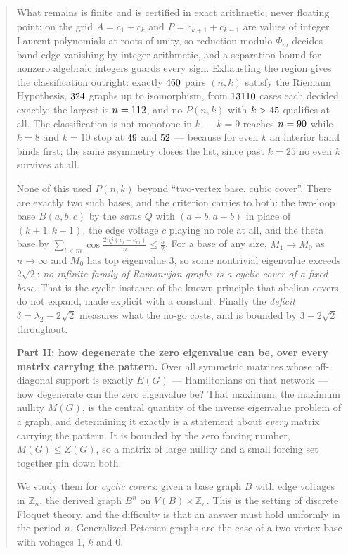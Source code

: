 \documentclass[11pt]{article}
\theoremstyle{definition}
\begin{document}
\begin{abstract}
What remains is finite and is certified in exact arithmetic, never floating
point: on the grid $A=c_1+c_k$ and $P=c_{k+1}+c_{k-1}$ are values of integer
Laurent polynomials at roots of unity, so reduction modulo $\Phi_m$ decides
band-edge vanishing by integer arithmetic, and a separation bound for nonzero
algebraic integers guards every sign. Exhausting the region gives the
classification outright: exactly $\RamAllTotal$ pairs $(n,k)$ satisfy the
Riemann Hypothesis, $\RamAllIso$ graphs up to isomorphism, from $\RamAllCases$
cases each decided exactly; the largest is $n=\RamAllMaxN$, and no $P(n,k)$ with
$k>\RamAllMaxK$ qualifies at all. The
classification is not monotone in $k$ --- $k=9$ reaches $n=\RamLastNine$ while
$k=8$ and $k=10$ stop at $\RamLastEight$ and $\RamLastTen$ --- because for even
$k$ an interior band binds first; the same asymmetry closes the list, since past
$k=25$ no even $k$ survives at all.

None of this used $P(n,k)$ beyond ``two-vertex base, cubic cover''. There are
exactly two such bases, and the criterion carries to both: the two-loop base
$B(a,b,c)$ by the \emph{same} $Q$ with $(a+b,a-b)$ in place of $(k+1,k-1)$, the
edge voltage $c$ playing no role at all, and the theta base by
$\sum_{l<m}\cos\frac{2\pi j(c_l-c_m)}{n}\le\frac52$. For a base of any size,
$M_1\to M_0$ as $n\to\infty$ and $M_0$ has top eigenvalue $3$, so some
nontrivial eigenvalue exceeds $2\sqrt2$: \emph{no infinite family of Ramanujan
graphs is a cyclic cover of a fixed base}. That is the cyclic instance of the
known principle that abelian covers do not expand, made explicit with a
constant. Finally the \emph{deficit} $\delta=\lambda_2-2\sqrt2$ measures what
the no-go costs, and is bounded by $3-2\sqrt2$ throughout.

\medskip\noindent\textbf{Part II: how degenerate the zero eigenvalue can be,
over every matrix carrying the pattern.}
Over all symmetric matrices whose off-diagonal support is exactly $E(G)$ ---
Hamiltonians on that network --- how degenerate can the zero eigenvalue be? That
maximum, the maximum nullity $M(G)$, is the central quantity of the inverse
eigenvalue problem of a graph, and determining it exactly is a statement about
\emph{every} matrix carrying the pattern. It is bounded by the zero forcing
number, $M(G)\le Z(G)$, so a matrix of large nullity and a small forcing set
together pin down both.

We study them for \emph{cyclic covers}: given a base graph $B$
with edge voltages in $\mathbb Z_n$, the derived graph $B^n$ on
$V(B)\times\mathbb Z_n$. This is the setting of discrete Floquet theory, and the
difficulty is that an answer must hold uniformly in the period $n$.
Generalized Petersen graphs are the case of a
two-vertex base with voltages $1$, $k$ and $0$.


\end{abstract}
\end{document}
